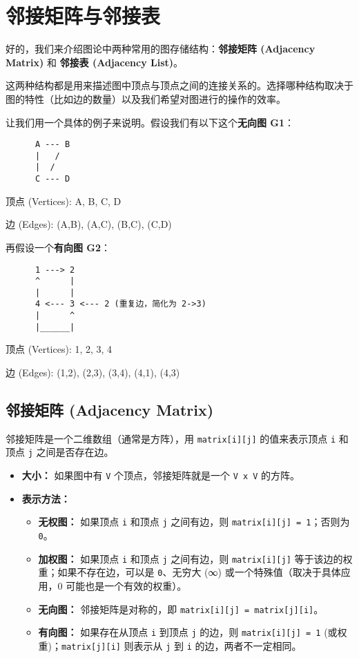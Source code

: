 \section{邻接矩阵与邻接表}

好的，我们来介绍图论中两种常用的图存储结构：\textbf{邻接矩阵 (Adjacency Matrix)} 和 \textbf{邻接表 (Adjacency List)}。

这两种结构都是用来描述图中顶点与顶点之间的连接关系的。选择哪种结构取决于图的特性（比如边的数量）以及我们希望对图进行的操作的效率。

让我们用一个具体的例子来说明。假设我们有以下这个\textbf{无向图 G1}：

\begin{lstlisting}
      A --- B
      |   /
      |  /
      C --- D
\end{lstlisting}
顶点 (Vertices): A, B, C, D

边 (Edges): (A,B), (A,C), (B,C), (C,D)

再假设一个\textbf{有向图 G2}：

\begin{lstlisting}
      1 ---> 2
      ^      |
      |      |
      4 <--- 3 <--- 2 (重复边，简化为 2->3)
      |      ^
      |______|
\end{lstlisting}
顶点 (Vertices): 1, 2, 3, 4

边 (Edges): (1,2), (2,3), (3,4), (4,1), (4,3)


\subsection{邻接矩阵 (Adjacency Matrix)}

邻接矩阵是一个二维数组（通常是方阵），用 \lstinline{matrix[i][j]} 的值来表示顶点 \lstinline{i} 和顶点 \lstinline{j} 之间是否存在边。

\begin{itemize}
	\item \textbf{大小：} 如果图中有 \lstinline{V} 个顶点，邻接矩阵就是一个 \lstinline{V x V} 的方阵。
	\item \textbf{表示方法：}
	\begin{itemize}
		\item \textbf{无权图：} 如果顶点 \lstinline{i} 和顶点 \lstinline{j} 之间有边，则 \lstinline{matrix[i][j] = 1}；否则为 \lstinline{0}。
		\item \textbf{加权图：} 如果顶点 \lstinline{i} 和顶点 \lstinline{j} 之间有边，则 \lstinline{matrix[i][j]} 等于该边的权重；如果不存在边，可以是 \lstinline{0}、无穷大 (∞) 或一个特殊值（取决于具体应用，0 可能也是一个有效的权重）。
		\item \textbf{无向图：} 邻接矩阵是对称的，即 \lstinline{matrix[i][j] = matrix[j][i]}。
		\item \textbf{有向图：} 如果存在从顶点 \lstinline{i} 到顶点 \lstinline{j} 的边，则 \lstinline{matrix[i][j] = 1} (或权重)；\lstinline{matrix[j][i]} 则表示从 \lstinline{j} 到 \lstinline{i} 的边，两者不一定相同。
	\end{itemize}
\end{itemize}

